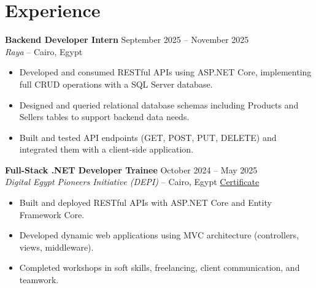 \section*{Experience}

\textbf{Backend Developer Intern} \hfill September 2025 -- November 2025 \\
\textit{Raya} -- Cairo, Egypt
\begin{itemize}
    \item Developed and consumed RESTful APIs using ASP.NET Core,
          implementing full CRUD operations with a SQL Server database.
    \item Designed and queried relational database schemas including
          Products and Sellers tables to support backend data needs.
    \item Built and tested API endpoints (GET, POST, PUT, DELETE) and
          integrated them with a client-side application.
\end{itemize}

\vspace{4pt}
\textbf{Full-Stack .NET Developer Trainee} \hfill October 2024 -- May 2025 \\
\textit{Digital Egypt Pioneers Initiative (DEPI)} -- Cairo, Egypt \hfill
\href{https://www.linkedin.com/posts/salmaamr129_dotnetdeveloper-backenddevelopment-fullstack-share-7348740681726615553-OEr0/}{Certificate}
\begin{itemize}
    \item Built and deployed RESTful APIs with ASP.NET Core and Entity
          Framework Core.
    \item Developed dynamic web applications using MVC architecture
          (controllers, views, middleware).
    \item Completed workshops in soft skills, freelancing, client
          communication, and teamwork.
\end{itemize}

